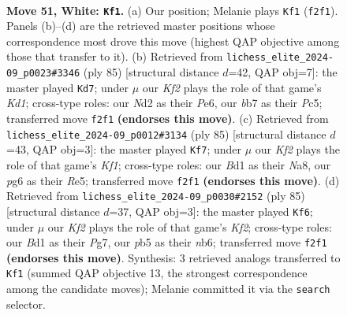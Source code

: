 \documentclass[11pt]{article}
\begin{document}
\clearpage

\begin{figure}[p]\centering
\begin{subfigure}{0.46\textwidth}\centering
\resizebox{\linewidth}{!}{%
\newchessgame
\chessboard[
  setfen={3rr3/1b3p1k/6p1/Rp6/7P/1P6/2PN1K2/R2B4 w - - 2 51},
  showmover=false,
  pgfstyle=straightmove, color=movearrow, markmove={f2-f1}
]}
\caption{}
\end{subfigure}\hfill
\begin{subfigure}{0.46\textwidth}\centering
\resizebox{\linewidth}{!}{%
\newchessgame
\chessboard[
  setfen={3k4/5p1r/4p3/2pr4/6P1/P1BbRP2/6KP/2R5 b - - 1 43},
  showmover=false,
  pgfstyle=straightmove, color=movearrow, markmove={d8-d7}
]}
\caption{}
\end{subfigure}
\\[4pt]
\begin{subfigure}{0.46\textwidth}\centering
\resizebox{\linewidth}{!}{%
\newchessgame
\chessboard[
  setfen={n3bk1R/8/6p1/2Npr3/3P4/1PP2P2/5K2/7R b - - 3 43},
  showmover=false,
  pgfstyle=straightmove, color=movearrow, markmove={f8-f7}
]}
\caption{}
\end{subfigure}\hfill
\begin{subfigure}{0.46\textwidth}\centering
\resizebox{\linewidth}{!}{%
\newchessgame
\chessboard[
  setfen={8/3R1kpp/1N6/1p3P2/4P3/3Pb3/1rr5/R6K b - - 2 43},
  showmover=false,
  pgfstyle=straightmove, color=movearrow, markmove={f7-f6}
]}
\caption{}
\end{subfigure}
\caption{\textbf{Move 51, White: \texttt{Kf1}.} (a) Our position; Melanie plays \texttt{Kf1} (\texttt{f2f1}). Panels (b)--(d) are the retrieved master positions whose correspondence most drove this move (highest QAP objective among those that transfer to it). (b) Retrieved from \texttt{lichess\_elite\_2024-09\_p0023\#3346} (ply 85) [structural distance $d$=42, QAP obj=7]: the master played \texttt{Kd7}; under $\mu$ our \emph{Kf2} plays the role of that game's \emph{Kd1}; cross-type roles: our \emph{N}d2 as their \emph{P}e6, our \emph{b}b7 as their \emph{P}c5; transferred move \texttt{f2f1} \textbf{(endorses this move)}. (c) Retrieved from \texttt{lichess\_elite\_2024-09\_p0012\#3134} (ply 85) [structural distance $d$=43, QAP obj=3]: the master played \texttt{Kf7}; under $\mu$ our \emph{Kf2} plays the role of that game's \emph{Kf1}; cross-type roles: our \emph{B}d1 as their \emph{N}a8, our \emph{p}g6 as their \emph{R}e5; transferred move \texttt{f2f1} \textbf{(endorses this move)}. (d) Retrieved from \texttt{lichess\_elite\_2024-09\_p0030\#2152} (ply 85) [structural distance $d$=37, QAP obj=3]: the master played \texttt{Kf6}; under $\mu$ our \emph{Kf2} plays the role of that game's \emph{Kf2}; cross-type roles: our \emph{B}d1 as their \emph{P}g7, our \emph{p}b5 as their \emph{n}b6; transferred move \texttt{f2f1} \textbf{(endorses this move)}. Synthesis: 3 retrieved analogs transferred to \texttt{Kf1} (summed QAP objective 13, the strongest correspondence among the candidate moves); Melanie committed it via the \texttt{search} selector.}
\label{fig:thought-m100}
\end{figure}
\end{document}
